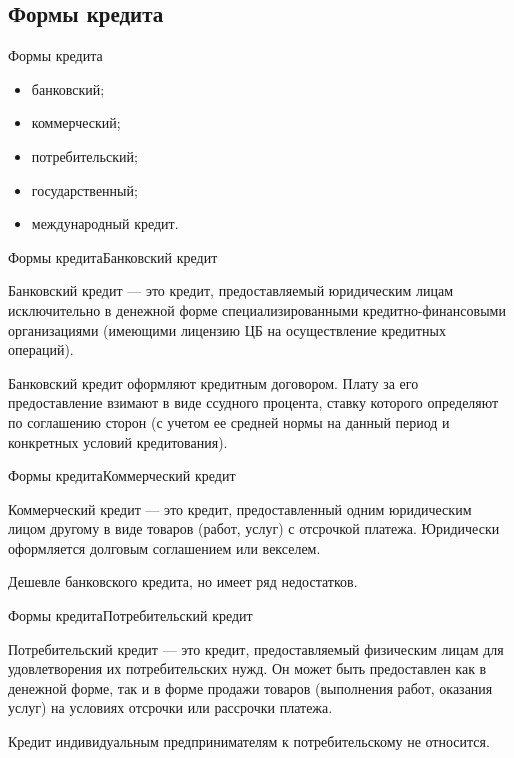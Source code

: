 \documentclass[_DKB_p2_Credit.tex]{subfiles}
\begin{document}
\subsection{Формы кредита}
\begin{frame}{Формы кредита}
\begin{itemize}[<+->]
\item
банковский;
\item
коммерческий;
\item
потребительский;
\item
государственный;
\item
международный кредит.
\end{itemize}
\end{frame}

\begin{frame}{Формы кредита}{Банковский кредит}
\begin{block}{Банковский кредит}
\quad
— это кредит, предоставляемый юридическим лицам исключительно в денежной форме специализированными кредитно-финансовыми организациями (имеющими лицензию ЦБ на осуществление кредитных операций). 

\end{block}
\end{frame}

\begin{frame}
Банковский кредит оформляют кредитным договором. Плату за его предоставление взимают в виде ссудного процента, ставку которого определяют по соглашению сторон (с учетом ее средней нормы на данный период и конкретных условий кредитования).
\end{frame}

\begin{frame}{Формы кредита}{Коммерческий кредит}
\begin{block}{Коммерческий кредит}
\quad 
— это кредит, предоставленный одним юридическим лицом другому в виде товаров (работ, услуг) с отсрочкой платежа. Юридически оформляется долговым соглашением или векселем. 

Дешевле банковского кредита, но имеет ряд недостатков.
\end{block}
\end{frame}

\begin{frame}{Формы кредита}{Потребительский кредит}
\begin{block}{Потребительский кредит}
\quad
— это кредит, предоставляемый физическим лицам для удовлетворения их потребительских нужд. Он может быть предоставлен как в денежной форме, так и в форме продажи товаров (выполнения работ, оказания услуг) на условиях отсрочки или рассрочки платежа.


Кредит индивидуальным предпринимателям к потребительскому не относится.
\end{block}
\end{frame}
\end{document}

